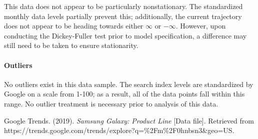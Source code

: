 \documentclass[12pt]{article}
\begin{document}
	This data does not appear to be particularly nonstationary.  The standardized monthly data levels partially prevent this; additionally, the current trajectory does not appear to be heading towards either $ \infty $ or $ -\infty $.  However, upon conducting the Dickey-Fuller test prior to model specification, a difference may still need to be taken to ensure stationarity.
	

\paragraph{Outliers}

	No outliers exist in this data sample.  The search index levels are standardized by Google on a scale from 1-100; as a result, all of the data points fall within this range.  No outlier treatment is necessary prior to analysis of this data.

\newpage
\begin{thebibliography}{1}
	
		
	Google Trends. (2019). \textit{Samsung Galaxy: Product Line} [Data file]. Retrieved from https://trends.google.com/trends/explore?q=\%2Fm\%2F0hnbsn3\&geo=US.
	
	
	
\end{thebibliography}
\end{document}
